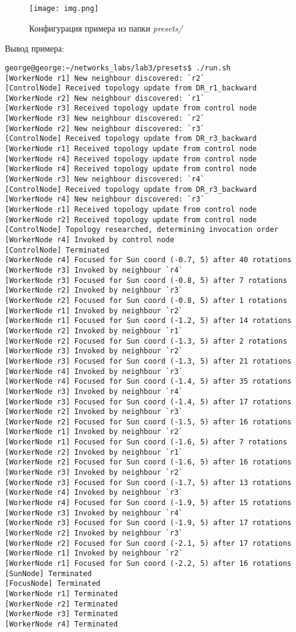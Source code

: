 \documentclass{report}
\begin{document}
\begin{figure}[!htb]
     \centering
     \texttt{[image: img.png]}
     \caption{Конфигурация примера из папки {\it presets/}}\label{Fig:Data1}
\end{figure}

\newline
\newpage
Вывод примера:
\begin{verbatim}
george@george:~/networks_labs/lab3/presets$ ./run.sh
[WorkerNode r1] New neighbour discovered: `r2`
[ControlNode] Received topology update from DR_r1_backward
[WorkerNode r2] New neighbour discovered: `r1`
[WorkerNode r3] Received topology update from control node
[WorkerNode r3] New neighbour discovered: `r2`
[WorkerNode r2] New neighbour discovered: `r3`
[ControlNode] Received topology update from DR_r3_backward
[WorkerNode r1] Received topology update from control node
[WorkerNode r4] Received topology update from control node
[WorkerNode r4] Received topology update from control node
[WorkerNode r3] New neighbour discovered: `r4`
[ControlNode] Received topology update from DR_r3_backward
[WorkerNode r4] New neighbour discovered: `r3`
[WorkerNode r1] Received topology update from control node
[WorkerNode r2] Received topology update from control node
[ControlNode] Topology researched, determining invocation order
[WorkerNode r4] Invoked by control node
[ControlNode] Terminated
[WorkerNode r4] Focused for Sun coord (-0.7, 5) after 40 rotations
[WorkerNode r3] Invoked by neighbour `r4`
[WorkerNode r3] Focused for Sun coord (-0.8, 5) after 7 rotations
[WorkerNode r2] Invoked by neighbour `r3`
[WorkerNode r2] Focused for Sun coord (-0.8, 5) after 1 rotations
[WorkerNode r1] Invoked by neighbour `r2`
[WorkerNode r1] Focused for Sun coord (-1.2, 5) after 14 rotations
[WorkerNode r2] Invoked by neighbour `r1`
[WorkerNode r2] Focused for Sun coord (-1.3, 5) after 2 rotations
[WorkerNode r3] Invoked by neighbour `r2`
[WorkerNode r3] Focused for Sun coord (-1.3, 5) after 21 rotations
[WorkerNode r4] Invoked by neighbour `r3`
[WorkerNode r4] Focused for Sun coord (-1.4, 5) after 35 rotations
[WorkerNode r3] Invoked by neighbour `r4`
[WorkerNode r3] Focused for Sun coord (-1.4, 5) after 17 rotations
[WorkerNode r2] Invoked by neighbour `r3`
[WorkerNode r2] Focused for Sun coord (-1.5, 5) after 16 rotations
[WorkerNode r1] Invoked by neighbour `r2`
[WorkerNode r1] Focused for Sun coord (-1.6, 5) after 7 rotations
[WorkerNode r2] Invoked by neighbour `r1`
[WorkerNode r2] Focused for Sun coord (-1.6, 5) after 16 rotations
[WorkerNode r3] Invoked by neighbour `r2`
[WorkerNode r3] Focused for Sun coord (-1.7, 5) after 13 rotations
[WorkerNode r4] Invoked by neighbour `r3`
[WorkerNode r4] Focused for Sun coord (-1.9, 5) after 15 rotations
[WorkerNode r3] Invoked by neighbour `r4`
[WorkerNode r3] Focused for Sun coord (-1.9, 5) after 17 rotations
[WorkerNode r2] Invoked by neighbour `r3`
[WorkerNode r2] Focused for Sun coord (-2.1, 5) after 17 rotations
[WorkerNode r1] Invoked by neighbour `r2`
[WorkerNode r1] Focused for Sun coord (-2.2, 5) after 16 rotations
[SunNode] Terminated
[FocusNode] Terminated
[WorkerNode r1] Terminated
[WorkerNode r2] Terminated
[WorkerNode r3] Terminated
[WorkerNode r4] Terminated


\end{verbatim}
\end{document}
